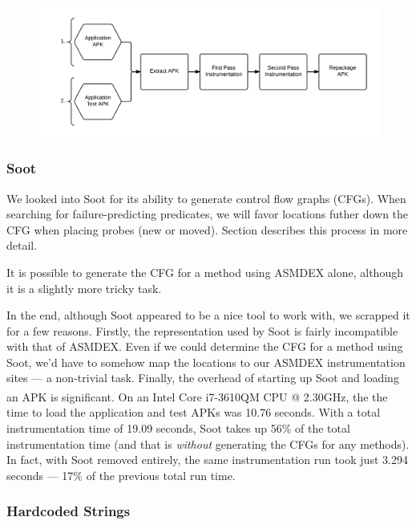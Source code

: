 \begin{figure}[h]
\includegraphics[width=\linewidth]{images/instrumenting_apk}
\caption{}
\label{fig:instrumenting_apk}
\end{figure}

\subsubsection{Soot}

We looked into Soot for its ability to generate control flow graphs (CFGs). When searching for failure-predicting predicates, we will favor locations futher down the CFG when placing probes (new or moved). Section  describes this process in more detail.

It is possible to generate the CFG for a method using ASMDEX alone, although it is a slightly more tricky task.

In the end, although Soot appeared to be a nice tool to work with, we scrapped it for a few reasons. Firstly, the representation used by Soot is fairly incompatible with that of ASMDEX. Even if we could determine the CFG for a method using Soot, we'd have to somehow map the locations to our ASMDEX instrumentation sites --- a non-trivial task. Finally, the overhead of starting up Soot and loading an APK is significant. On an Intel\textsuperscript{\textregistered} Core\textsuperscript{\texttrademark} i7-3610QM CPU @ 2.30GHz, the the time to load the application and test APKs was 10.76 seconds. With a total instrumentation time of 19.09 seconds, Soot takes up 56\% of the total instrumentation time (and that is \textit{without} generating the CFGs for any methods). In fact, with Soot removed entirely, the same instrumentation run took just 3.294 seconds --- 17\% of the previous total run time.

\subsubsection{Hardcoded Strings}

